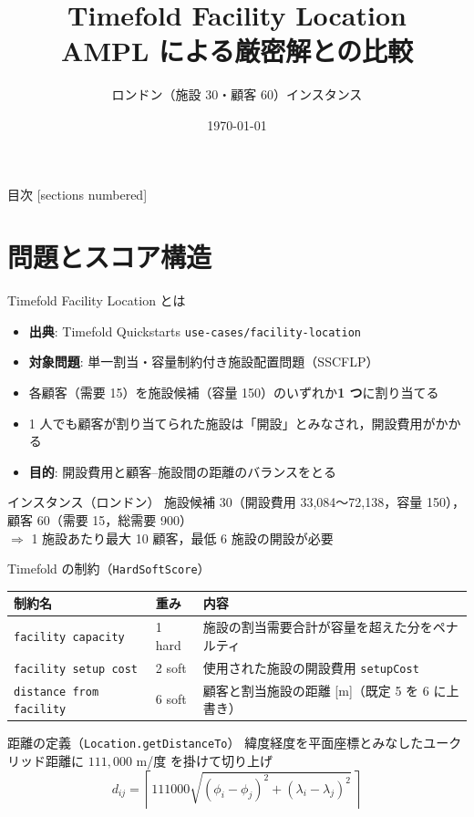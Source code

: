 \documentclass[aspectratio=169,11pt]{beamer}
\title{Timefold Facility Location\\AMPL による厳密解との比較}
\subtitle{ロンドン（施設 30・顧客 60）インスタンス}
\date{\today}
\author{}
\begin{document}
\maketitle

\begin{frame}{目次}
  [sections numbered]
  \tableofcontents
\end{frame}

\section{問題とスコア構造}

\begin{frame}{Timefold Facility Location とは}
  \begin{itemize}
    \item \textbf{出典}: Timefold Quickstarts \texttt{use-cases/facility-location}
    \item \textbf{対象問題}: \alert{単一割当・容量制約付き施設配置問題}（SSCFLP）
    \item 各顧客（需要 15）を施設候補（容量 150）のいずれか\textbf{1 つ}に割り当てる
    \item 1 人でも顧客が割り当てられた施設は「開設」とみなされ，開設費用がかかる
    \item \textbf{目的}: 開設費用と顧客--施設間の距離のバランスをとる
  \end{itemize}
  \vspace{0.5em}
  \begin{block}{インスタンス（ロンドン）}
    施設候補 30（開設費用 33{,}084〜72{,}138，容量 150），顧客 60（需要 15，総需要 900）\\
    $\Rightarrow$ 1 施設あたり最大 10 顧客，最低 6 施設の開設が必要
  \end{block}
\end{frame}

\begin{frame}{Timefold の制約（\texttt{HardSoftScore}）}
  \small
  \begin{tabularx}{\textwidth}{p{50mm}p{15mm}L}
    \toprule
    制約名 & 重み & 内容 \\
    \midrule
    \texttt{facility capacity} & 1 hard & 施設の割当需要合計が容量を超えた分をペナルティ \\
    \texttt{facility setup cost} & 2 soft & 使用された施設の開設費用 \texttt{setupCost} \\
    \texttt{distance from facility} & 6 soft & 顧客と割当施設の距離 [m]（既定 5 を 6 に上書き） \\
    \bottomrule
  \end{tabularx}
  \vspace{0.8em}
  \begin{block}{距離の定義（\texttt{Location.getDistanceTo}）}
    緯度経度を平面座標とみなしたユークリッド距離に $111{,}000$ m/度 を掛けて切り上げ
    \[
      d_{ij} = \left\lceil 111000 \sqrt{(\phi_i-\phi_j)^2 + (\lambda_i-\lambda_j)^2}\,\right\rceil
    \]
  \end{block}
\end{frame}
\end{document}
